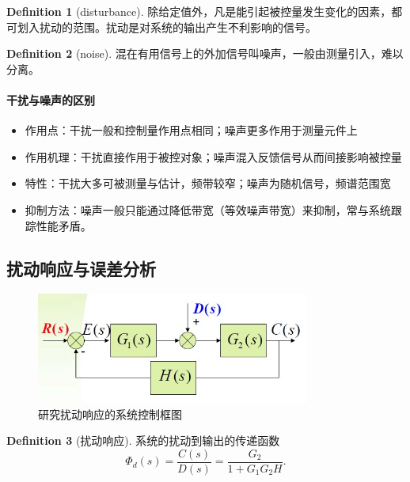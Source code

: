 \documentclass[14pt,a4paper]{article}
\theoremstyle{plain}
\theoremstyle{definition}
\newtheorem*{dfn}{Definition}
\theoremstyle{remark}
\theoremstyle{plain}
\theoremstyle{plain}
\theoremstyle{definition}
\begin{document}
		\begin{dfn}[disturbance]  
		\label{dfn:disturbance}
			除给定值外，凡是能引起被控量发生变化的因素，都可划入扰动的范围。扰动是对系统的输出产生不利影响的信号。
		\end{dfn} 

		\begin{dfn}[noise]  
		\label{dfn:noise}
			混在有用信号上的外加信号叫噪声，一般由测量引入，难以分离。
		\end{dfn}

		\paragraph{干扰与噪声的区别}%
		\label{par:干扰与噪声的区别}
		
		\begin{itemize}
			\item 作用点：干扰一般和控制量作用点相同；噪声更多作用于测量元件上
			\item 作用机理：干扰直接作用于被控对象；噪声混入反馈信号从而间接影响被控量
			\item 特性：干扰大多可被测量与估计，频带较窄；噪声为随机信号，频谱范围宽
			\item 抑制方法：噪声一般只能通过降低带宽（等效噪声带宽）来抑制，常与系统跟踪性能矛盾。
		\end{itemize}  
	
		\subsection{扰动响应与误差分析}%
		\label{sub:扰动响应与误差分析}
			\begin{figure}[H]
				\centering
				\includegraphics[width=0.8\textwidth]{./figures/disturbance.jpg} 
				\caption{研究扰动响应的系统控制框图}
				\label{fig:disturbance}
			\end{figure}

			\begin{dfn}[扰动响应]  
			\label{dfn:扰动响应}
				系统的扰动到输出的传递函数
				\[
					\varPhi_d (s) = \dfrac{C(s)}{D(s)} = \dfrac{G_2}{1+G_1 G_2 H}
				.\] 
			\end{dfn} 
\end{document}
